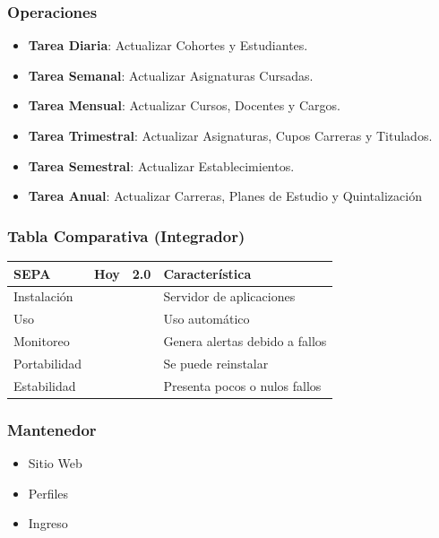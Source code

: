 \documentclass{beamer}
\newcommand{\cmark}{\ding{51}}%
\newcommand{\xmark}{\ding{55}}%
\begin{document}

\begin{frame}
\frametitle{Operaciones}
\begin{itemize}
\item \textbf{Tarea Diaria}: Actualizar Cohortes y Estudiantes.
\item \textbf{Tarea Semanal}: Actualizar Asignaturas Cursadas.
\item \textbf{Tarea Mensual}: Actualizar Cursos, Docentes y Cargos.
\item \textbf{Tarea Trimestral}: Actualizar Asignaturas, Cupos Carreras y Titulados.
\item \textbf{Tarea Semestral}: Actualizar Establecimientos.
\item \textbf{Tarea Anual}: Actualizar Carreras, Planes de Estudio y Quintalización
\end{itemize}
\end{frame}


\begin{frame}
\frametitle{Tabla Comparativa (Integrador)}
\begin{table}
\begin{tabular}{l l l l}
\toprule
\textbf{SEPA} & \textbf{Hoy} & \textbf{2.0} & Característica\\
\midrule
Instalación 	& \textcolor{green}{\cmark} & \textcolor{green}{\cmark} & Servidor de aplicaciones  \\
Uso		 		& \textcolor{green}{\cmark} & \textcolor{green}{\cmark} & Uso automático \\
Monitoreo 		& \textcolor{red}{\xmark}   & \textcolor{green}{\cmark} & Genera alertas debido a fallos \\
Portabilidad 	& \textcolor{red}{\xmark}   & \textcolor{green}{\cmark} & Se puede reinstalar \\
Estabilidad 	& \textcolor{red}{\xmark}   & \textcolor{green}{\cmark} & Presenta pocos o nulos fallos \\
\bottomrule
\end{tabular}
\end{table}
\end{frame}


\begin{frame}
\frametitle{Mantenedor}
\begin{itemize}
\item Sitio Web
\item Perfiles
\item Ingreso
\end{itemize}
\end{frame}
\end{document}
